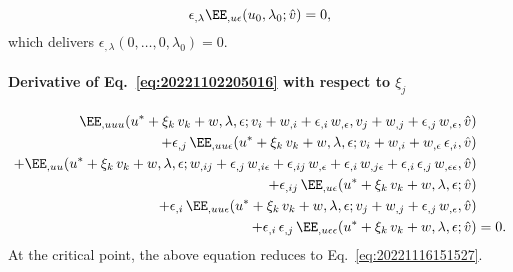 \begin{equation}
  \epsilon_{,\lambda} \EE_{,u\epsilon}(u_0, \lambda_0; \hat{v}) = 0,
\end{equation}
which delivers \(\epsilon_{,\lambda}(0, \ldots, 0, \lambda_0) = 0\).

\paragraph{Derivative of Eq.~\eqref{eq:20221102205016} with respect to \(\xi_j\)}
\begin{equation}
  \label{eq:20221109062643}
  \begin{aligned}[b]
    \EE_{,uuu}(u^\ast + \xi_k \, v_k + w, \lambda, \epsilon; v_i + w_{,i} + \epsilon_{,i} \,  w_{,\epsilon}, v_j + w_{,j} + \epsilon_{,j} \, w_{,\epsilon}, \hat{v})&\\
    + \epsilon_{,j} \, \EE_{,uu\epsilon}(u^\ast + \xi_k \, v_k + w, \lambda, \epsilon; v_i + w_{,i} + w_{,\epsilon} \, \epsilon_{,i}, \hat{v})&\\
    + \EE_{,uu}(u^\ast + \xi_k \, v_k + w, \lambda, \epsilon; w_{,ij} + \epsilon_{,j} \, w_{,i\epsilon} + \epsilon_{,ij} \, w_{,\epsilon} + \epsilon_{,i} \, w_{,j\epsilon} + \epsilon_{,i} \, \epsilon_{,j} \, w_{,\epsilon\epsilon} , \hat{v})&\\
    + \epsilon_{,ij} \, \EE_{,u\epsilon}(u^\ast + \xi_k \, v_k + w, \lambda, \epsilon; \hat{v})&\\
    + \epsilon_{,i} \, \EE_{,uu\epsilon}(u^\ast + \xi_k \, v_k + w, \lambda, \epsilon; v_j + w_{,j} + \epsilon_{,j} \, w_{,\epsilon}, \hat{v})&\\
    + \epsilon_{,i} \, \epsilon_{,j} \, \EE_{,u\epsilon\epsilon}(u^\ast + \xi_k \, v_k + w, \lambda, \epsilon; \hat{v}) &= 0.
  \end{aligned}
\end{equation}
At the critical point, the above equation reduces to Eq.~\eqref{eq:20221116151527}.

